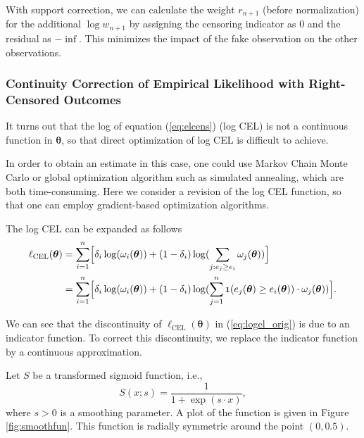 \documentclass[article]{jss}
\renewcommand{\|}{\,|\,}
\begin{document}
With support correction, we can calculate the weight \(r_{n+1}\) (before normalization) for the additional \(\log w_{n+1}\) by assigning the censoring indicator as \(0\) and the residual as \(-\inf\). This minimizes the impact of the fake observation on the other observations.

\hypertarget{continuity-correction-of-empirical-likelihood-with-right-censored-outcomes}{%
\subsubsection{Continuity Correction of Empirical Likelihood with Right-Censored Outcomes}\label{continuity-correction-of-empirical-likelihood-with-right-censored-outcomes}}

It turns out that the log of equation (\ref{eq:elcens}) (log CEL) is not a continuous function in \(\bm \theta\), so that direct optimization of log CEL is difficult to achieve.

In order to obtain an estimate in this case, one could use Markov Chain Monte Carlo or global optimization algorithm such as simulated annealing, which are both time-consuming. Here we consider a revision of the log CEL function, so that one can employ gradient-based optimization algorithms.

The log CEL can be expanded as follows
\begin{equation}
\begin{split}
\ell_{\textrm{CEL}}(\bm \theta) &= \sum_{i=1}^n \Bigl[\delta_i\log(\omega_i(\bm \theta)) +
  (1-\delta_i)\log(\sum_{j:e_j \geq e_i} \omega_j(\bm \theta))\Bigr] \\
  &= \sum_{i=1}^n \Bigl[\delta_i\log(\omega_i(\bm \theta)) +
    (1-\delta_i)\log(\sum_{j=1}^n \mathfrak 1(e_j(\bm \theta) \geq e_i(\bm \theta)) \cdot \omega_j(\bm \theta))\Bigr].
\end{split}
\label{eq:logel_orig}
\end{equation}

We can see that the discontinuity of \(\ell_{\textrm{CEL}}(\bm \theta)\) in (\ref{eq:logel_orig}) is due to an indicator function. To correct this discontinuity, we replace the indicator function by a continuous approximation.

Let \(S\) be a transformed sigmoid function, i.e.,
\begin{equation}\label{eq:sigmoid}
  S(x; s) = \frac{1}{1+\exp(s\cdot x)},
\end{equation}
where \(s > 0\) is a smoothing parameter. A plot of the function is given in Figure \ref{fig:smoothfun}. This function is radially symmetric around the point \((0,0.5)\).
\end{document}
